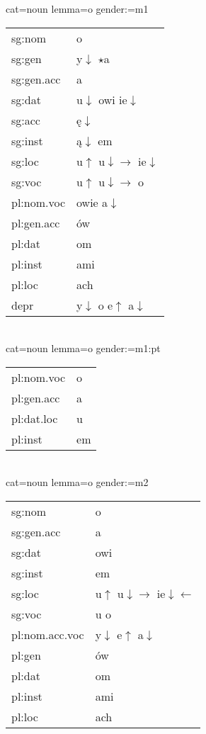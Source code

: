 \documentclass{article}
\begin{document}
\begin{multicols}{2}
cat=noun lemma=o gender:=m1\\
\begin{tabular}{l|l}
sg:nom & o\\
sg:gen & y$\downarrow$ $\star$a\\
sg:gen.acc & a\\
sg:dat & u$\downarrow$ owi ie$\downarrow$\\
sg:acc & ę$\downarrow$\\
sg:inst & ą$\downarrow$ em\\
sg:loc & u$\uparrow$ u$\downarrow\rightarrow$ ie$\downarrow$\\
sg:voc & u$\uparrow$ u$\downarrow\rightarrow$ o\\
pl:nom.voc & owie a$\downarrow$\\
pl:gen.acc & ów\\
pl:dat & om\\
pl:inst & ami\\
pl:loc & ach\\
depr & y$\downarrow$ o e$\uparrow$ a$\downarrow$\\
\end{tabular}\\

cat=noun lemma=o gender:=m1:pt\\
\begin{tabular}{l|l}
pl:nom.voc & o\\
pl:gen.acc & a\\
pl:dat.loc & u\\
pl:inst & em\\
\end{tabular}\\

cat=noun lemma=o gender:=m2\\
\begin{tabular}{l|l}
sg:nom & o\\
sg:gen.acc & a\\
sg:dat & owi\\
sg:inst & em\\
sg:loc & u$\uparrow$ u$\downarrow\rightarrow$ ie$\downarrow\leftarrow$\\
sg:voc & u o\\
pl:nom.acc.voc & y$\downarrow$ e$\uparrow$ a$\downarrow$\\
pl:gen & ów\\
pl:dat & om\\
pl:inst & ami\\
pl:loc & ach\\
\end{tabular}\\


\end{multicols}
\end{document}

